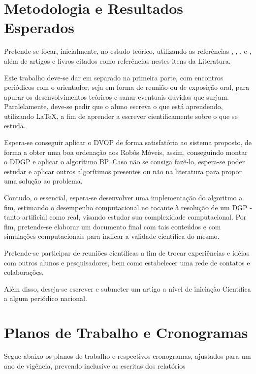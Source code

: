\documentclass[11pt]{article}
\begin{document}
{{\section{Metodologia e Resultados Esperados}
 
Pretende-se focar, inicialmente, no estudo teórico, utilizando as referências \cite{savvides2001dynamic}, \cite{NetworkLocalizationEren}, \cite{carlile:MinimalOrder}, \cite{carlileGDandAplications} e \cite{carlile:DDGP}, além de artigos e livros citados como referências nestes itens da Literatura. 

Este trabalho deve-se dar em separado na primeira parte, com encontros periódicos com o orientador, seja em forma de reunião ou de exposição oral, para apurar os desenvolvimentos teóricos e sanar eventuais dúvidas que surjam. Paralelamente, deve-se pedir que o aluno escreva o que está aprendendo, utilizando LaTeX, a fim de aprender a escrever cientificamente sobre o que se estuda.

Espera-se conseguir aplicar o DVOP de forma satisfatória ao sistema proposto, de forma a obter uma boa ordenação aos Robôs Móveis, assim, conseguindo montar o DDGP e aplicar o algorítimo BP. Caso não se consiga fazê-lo, espera-se poder estudar e aplicar outros algorítimos presentes ou não na literatura para propor uma solução ao problema. 

Contudo, o essencial, espera-se desenvolver uma implementação do algoritmo a fim, estimando o desempenho computacional no tocante à resolução de um DGP - tanto artificial como real, visando estudar sua complexidade computacional. Por fim, pretende-se elaborar um documento final com tais conteúdos e com simulações computacionais para indicar a validade científica do mesmo.

Pretende-se participar de reuniões científicas a fim de trocar experiências e idéias com outros alunos e pesquisadores, bem como estabelecer uma rede de contatos e colaborações.

Além disso, deseja-se escrever e submeter um artigo a nível de iniciação Científica a algum periódico nacional.

\section{Planos de Trabalho e Cronogramas}

Segue abaixo os planos de trabalho e respectivos cronogramas, ajustados para um ano de vigência, prevendo inclusive as escritas dos relatórios
	
}}
\end{document}
